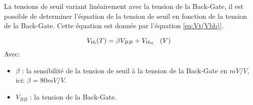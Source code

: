 La tensions de seuil variant linéairement avec la tension de la Back-Gate, il est possible de determiner l'équation de la tension de seuil en fonction de la tension de la Back-Gate. Cette équation est donnée par l'équation \ref{eq:Vt(Vbb)}.

\begin{equation}
    V_{th}(T) = \beta V_{BB} + V_{th_0}\hspace*{0.3cm}(V)
    \label{eq:Vt(Vbb)}
\end{equation}
Avec:

\begin{itemize}
    \item $\beta$ : la sensibilité de la tension de seuil à la tension de la Back-Gate en $mV/V$, ici: $\beta=80mV/V$.
    \item $V_{BB}$ : la tension de la Back-Gate.
\end{itemize}
